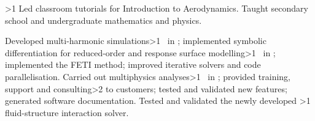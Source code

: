 \ifnum\value{npages}>1
    \vbox{
    {
        Led classroom tutorials for Introduction to Aerodynamics.
    }
    {
        Taught secondary school and undergraduate mathematics and physics.
    }
    }
\fi

\vbox{
{
    Developed multi-harmonic simulations\ifnum\value{npages}>1
        \ in \fi;
    implemented symbolic differentiation for reduced-order and response surface modelling\ifnum\value{npages}>1
        \ in \fi;
    implemented the FETI method;
    improved iterative solvers and code parallelisation.
}
{
    Carried out multiphysics analyses\ifnum\value{npages}>1
        \ in \fi;
        provided training, support and consulting\ifnum\value{npages}>2 to customers;
        tested and validated new features;
        generated software documentation\fi.
}
{
    Tested and validated the newly developed
    \ifnum\value{npages}>1
    \else
        fluid-structure interaction
    \fi
    solver.
}
}